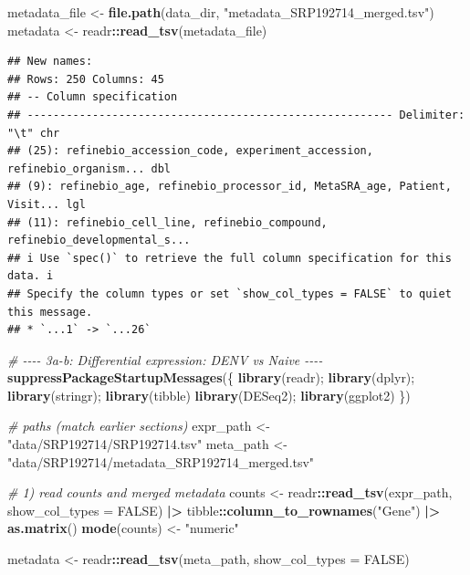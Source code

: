 \documentclass[
]{article}
\newenvironment{Shaded}{\begin{snugshade}}{\end{snugshade}}
\newcommand{\AttributeTok}[1]{\textcolor[rgb]{0.13,0.29,0.53}{#1}}
\newcommand{\CommentTok}[1]{\textcolor[rgb]{0.56,0.35,0.01}{\textit{#1}}}
\newcommand{\ConstantTok}[1]{\textcolor[rgb]{0.56,0.35,0.01}{#1}}
\newcommand{\FunctionTok}[1]{\textcolor[rgb]{0.13,0.29,0.53}{\textbf{#1}}}
\newcommand{\NormalTok}[1]{#1}
\newcommand{\OtherTok}[1]{\textcolor[rgb]{0.56,0.35,0.01}{#1}}
\newcommand{\SpecialCharTok}[1]{\textcolor[rgb]{0.81,0.36,0.00}{\textbf{#1}}}
\newcommand{\StringTok}[1]{\textcolor[rgb]{0.31,0.60,0.02}{#1}}
\begin{document}
\begin{Shaded}
\begin{Highlighting}[]
\NormalTok{metadata\_file }\OtherTok{\textless{}{-}} \FunctionTok{file.path}\NormalTok{(data\_dir, }\StringTok{"metadata\_SRP192714\_merged.tsv"}\NormalTok{)}
\NormalTok{metadata }\OtherTok{\textless{}{-}}\NormalTok{ readr}\SpecialCharTok{::}\FunctionTok{read\_tsv}\NormalTok{(metadata\_file)}
\end{Highlighting}
\end{Shaded}

\begin{verbatim}
## New names:
## Rows: 250 Columns: 45
## -- Column specification
## -------------------------------------------------------- Delimiter: "\t" chr
## (25): refinebio_accession_code, experiment_accession, refinebio_organism... dbl
## (9): refinebio_age, refinebio_processor_id, MetaSRA_age, Patient, Visit... lgl
## (11): refinebio_cell_line, refinebio_compound, refinebio_developmental_s...
## i Use `spec()` to retrieve the full column specification for this data. i
## Specify the column types or set `show_col_types = FALSE` to quiet this message.
## * `...1` -> `...26`
\end{verbatim}

\begin{Shaded}
\begin{Highlighting}[]
\CommentTok{\# {-}{-}{-}{-} 3a{-}b: Differential expression: DENV vs Naive {-}{-}{-}{-}}
\FunctionTok{suppressPackageStartupMessages}\NormalTok{(\{}
  \FunctionTok{library}\NormalTok{(readr); }\FunctionTok{library}\NormalTok{(dplyr); }\FunctionTok{library}\NormalTok{(stringr); }\FunctionTok{library}\NormalTok{(tibble)}
  \FunctionTok{library}\NormalTok{(DESeq2); }\FunctionTok{library}\NormalTok{(ggplot2)}
\NormalTok{\})}

\CommentTok{\# paths (match earlier sections)}
\NormalTok{expr\_path }\OtherTok{\textless{}{-}} \StringTok{"data/SRP192714/SRP192714.tsv"}
\NormalTok{meta\_path }\OtherTok{\textless{}{-}} \StringTok{"data/SRP192714/metadata\_SRP192714\_merged.tsv"}

\CommentTok{\# 1) read counts and merged metadata}
\NormalTok{counts }\OtherTok{\textless{}{-}}\NormalTok{ readr}\SpecialCharTok{::}\FunctionTok{read\_tsv}\NormalTok{(expr\_path, }\AttributeTok{show\_col\_types =} \ConstantTok{FALSE}\NormalTok{) }\SpecialCharTok{|\textgreater{}}
\NormalTok{  tibble}\SpecialCharTok{::}\FunctionTok{column\_to\_rownames}\NormalTok{(}\StringTok{"Gene"}\NormalTok{) }\SpecialCharTok{|\textgreater{}}
  \FunctionTok{as.matrix}\NormalTok{()}
\FunctionTok{mode}\NormalTok{(counts) }\OtherTok{\textless{}{-}} \StringTok{"numeric"}

\NormalTok{metadata }\OtherTok{\textless{}{-}}\NormalTok{ readr}\SpecialCharTok{::}\FunctionTok{read\_tsv}\NormalTok{(meta\_path, }\AttributeTok{show\_col\_types =} \ConstantTok{FALSE}\NormalTok{)}
\end{Highlighting}
\end{Shaded}
\end{document}

